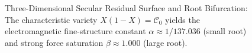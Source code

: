 \documentclass[
    12pt,
    a4paper,
    headings=normal,
    twoside=false,
    open=any,
    parskip=half
]{scrbook}
\begin{document}
\begin{figure}[htbp]
\caption{Three-Dimensional Secular Residual Surface and Root Bifurcation: The characteristic variety $X(1-X) = \mathcal{C}_0$ yields the electromagnetic fine-structure constant $\alpha \approx 1/137.036$ (small root) and strong force saturation $\beta \approx 1.000$ (large root).}
\label{fig:ch5_root_bifurcation_3d}
\end{figure}
\end{document}
